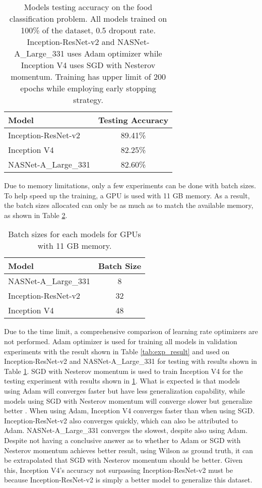 \documentclass[a4paper]{article}
\begin{document}
\begin{table}
\centering
\begin{tabular}{l|c}
Model & Testing Accuracy \\\hline
Inception-ResNet-v2 \cite{Szegedy2016} & 89.41\% \\
Inception V4 \cite{Szegedy2016} & 82.25\% \\
NASNet-A\_Large\_331 \cite{Zoph2017} &  82.60\% \\
\end{tabular}
\caption{\label{tab:test_result}Models testing accuracy on the food classification problem. All models trained on 100\% of the dataset, 0.5 dropout rate. Inception-ResNet-v2 and NASNet-A\_Large\_331 uses Adam optimizer while Inception V4 uses SGD with Nesterov momentum. Training has upper limit of 200 epochs while employing early stopping strategy.}
\end{table}

Due to memory limitations, only a few experiments can be done with batch sizes. To help speed up the training, a GPU is used with 11 GB memory. As a result, the batch sizes allocated can only be as much as to match the available memory, as shown in Table \ref{tab:batch_sizes}. \\

\begin{table}
\centering
\begin{tabular}{l|c}
Model & Batch Size \\\hline
NASNet-A\_Large\_331 \cite{Zoph2017} & 8 \\
Inception-ResNet-v2 \cite{Szegedy2016} & 32 \\
Inception V4 \cite{Szegedy2016} & 48 \\
\end{tabular}
\caption{\label{tab:batch_sizes}Batch sizes for each models for GPUs with 11 GB memory.}
\end{table}

Due to the time limit, a comprehensive comparison of learning rate optimizers are not performed. Adam optimizer is used for training all models in validation experiments with the result shown in Table \ref{tab:exp_result} and used on Inception-ResNet-v2 and NASNet-A\_Large\_331 for testing with results shown in Table \ref{tab:test_result}. SGD with Nesterov momentum is used to train Inception V4 for the testing experiment with results shown in \ref{tab:test_result}. What is expected is that models using Adam will converges faster but have less generalization capability, while models using SGD with Nesterov momentum will converge slower but generalize better \cite{Wilson2017}. When using Adam, Inception V4 converges faster than when using SGD. Inception-ResNet-v2 also converges quickly, which can also be attributed to Adam. NASNet-A\_Large\_331 converges the slowest, despite also using Adam. Despite not having a conclusive answer as to whether to Adam or SGD with Nesterov momentum achieves better result, using Wilson \cite{Wilson2017} as ground truth, it can be extrapolated that SGD with Nesterov momentum should be better. Given this, Inception V4's accuracy not surpassing Inception-ResNet-v2 must be because Inception-ResNet-v2 is simply a better model to generalize this dataset. \\
\end{document}
